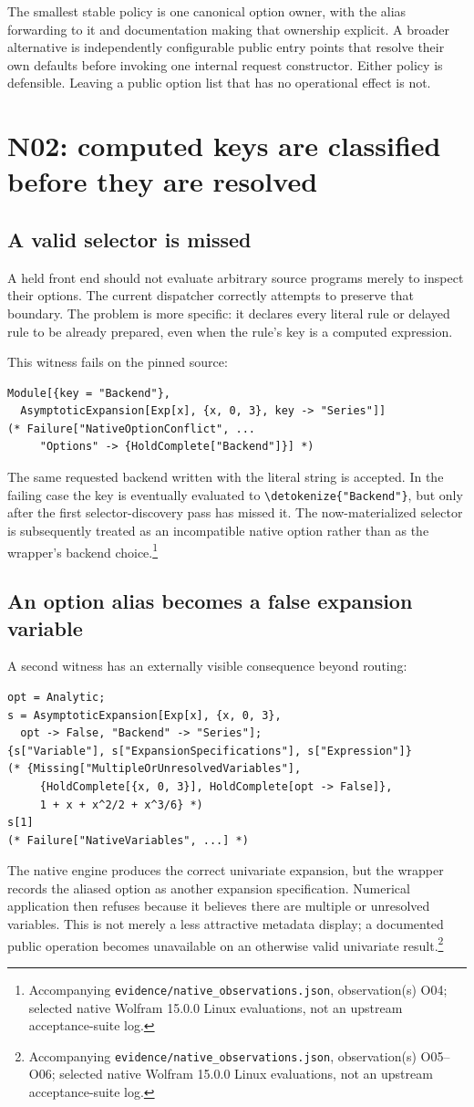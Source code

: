 \documentclass[11pt]{article}
\newcommand{\code}[1]{{\ttfamily\expandafter\nolinkurl\expandafter{\detokenize{#1}}}}
\newcommand{\obs}[1]{\footnote{Accompanying \nolinkurl{evidence/native_observations.json}, observation(s) #1; selected native Wolfram 15.0.0 Linux evaluations, not an upstream acceptance-suite log.}}
\begin{document}
The smallest stable policy is one canonical option owner, with the alias forwarding to it and documentation making that ownership explicit. A broader alternative is independently configurable public entry points that resolve their own defaults before invoking one internal request constructor. Either policy is defensible. Leaving a public option list that has no operational effect is not.

\section{N02: computed keys are classified before they are resolved}
\label{sec:n02}

\subsection{A valid selector is missed}
A held front end should not evaluate arbitrary source programs merely to inspect their options. The current dispatcher correctly attempts to preserve that boundary. The problem is more specific: it declares every literal rule or delayed rule to be already prepared, even when the rule's key is a computed expression.

This witness fails on the pinned source:
\begin{lstlisting}
Module[{key = "Backend"},
  AsymptoticExpansion[Exp[x], {x, 0, 3}, key -> "Series"]]
(* Failure["NativeOptionConflict", ...
     "Options" -> {HoldComplete["Backend"]}] *)
\end{lstlisting}
The same requested backend written with the literal string is accepted. In the failing case the key is eventually evaluated to \code{"Backend"}, but only after the first selector-discovery pass has missed it. The now-materialized selector is subsequently treated as an incompatible native option rather than as the wrapper's backend choice.\obs{O04}

\subsection{An option alias becomes a false expansion variable}
A second witness has an externally visible consequence beyond routing:
\begin{lstlisting}
opt = Analytic;
s = AsymptoticExpansion[Exp[x], {x, 0, 3},
  opt -> False, "Backend" -> "Series"];
{s["Variable"], s["ExpansionSpecifications"], s["Expression"]}
(* {Missing["MultipleOrUnresolvedVariables"],
     {HoldComplete[{x, 0, 3}], HoldComplete[opt -> False]},
     1 + x + x^2/2 + x^3/6} *)
s[1]
(* Failure["NativeVariables", ...] *)
\end{lstlisting}
The native engine produces the correct univariate expansion, but the wrapper records the aliased option as another expansion specification. Numerical application then refuses because it believes there are multiple or unresolved variables. This is not merely a less attractive metadata display; a documented public operation becomes unavailable on an otherwise valid univariate result.\obs{O05--O06}
\end{document}
